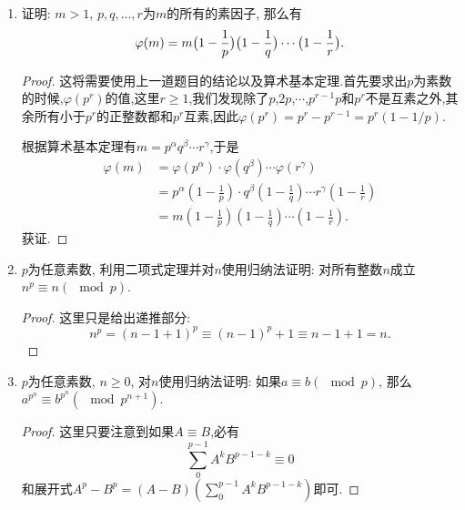 \documentclass[12pt,a4paper]{book} %
\theoremstyle{remark}
\theoremstyle{example}
\theoremstyle{lemma}
\theoremstyle{corollary}
\numberwithin{theorem}{chapter}
\begin{document}
\begin{enumerate}
\begin{proof}
有了这个结论,可以这样来证明:对于每一个与$m$互素的$a$和与$n$互素的$b$，都存在唯一的一个与$mn$互素的$x$,并且不同的$a$和$b$的组合,对应不同的$x$.反证即可,如果不同的$a$和$b$组合,对应到了同一个$x$,将会发生矛盾.即$m|(x-a_1)$,$m|(x-a_2)$,于是$m|(a_1-a_2)$,也就是$a_1 \equiv a_2(\mod{m})$.

反过来,由于当$(x,mn)=1$时,必有$(x,m)=1$和$(x,n)=1$.因此对于每一个与$mn$互素的$x$,必然对应与$m$互素的$a$和与$n$互素的$b$,显然一个$x$只能属于一个模$m$或者$n$的同余类.

有了上述一一对应,根据乘法原理应该有$\varphi(m)\varphi(n) = \varphi(mn)$.
\end{proof}

\item 证明: $m > 1$, $p, q, \ldots, r$为$m$的所有的素因子, 那么有
\[
\varphi(m) = m \big{(} 1 - \frac{1}{p} \big{)} \big{(} 1 - \frac{1}{q} \big{)} \cdots \big{(} 1 - \frac{1}{r} \big{)}.
\]

\begin{proof}
这将需要使用上一道题目的结论以及算术基本定理.首先要求出$p$为素数的时候,$\varphi(p^r)$的值,这里$r \ge 1$,我们发现除了$p$,$2p$,$\cdots$,$p^{r-1}p$和$p^r$不是互素之外,其余所有小于$p^r$的正整数都和$p^r$互素,因此$\varphi(p^r) = p^{r} - p^{r-1} = p^{r}(1 - 1/p)$.

根据算术基本定理有$m=p^{\alpha}q^{\beta}\cdots r^{\gamma}$,于是
\[
\begin{aligned}
\varphi(m) &= \varphi(p^{\alpha}) \cdot \varphi(q^{\beta}) \cdots \varphi(r^{\gamma}) \\
&= p^{\alpha}(1 - \frac{1}{p}) \cdot q^{\beta}(1 - \frac{1}{q}) \cdots r^{\gamma}(1 - \frac{1}{r}) \\
&= m(1 - \frac{1}{p})(1 - \frac{1}{q})\cdots(1 - \frac{1}{r}).
\end{aligned}
\]
获证.
\end{proof}

\item $p$为任意素数, 利用二项式定理并对$n$使用归纳法证明: 对所有整数$n$成立$n^p \equiv n (\mod p)$.

\begin{proof}
这里只是给出递推部分:
\[
n^p = (n-1+1)^p \equiv (n-1)^p + 1 \equiv n-1+1=n.
\]
\end{proof}

\item $p$为任意素数, $n \ge 0$, 对$n$使用归纳法证明: 如果$a \equiv b (\mod p)$, 那么$a^{p^n} \equiv b^{p^n} (\mod p^{n + 1})$.
\begin{proof}
这里只要注意到如果$A \equiv B$,必有
\[
\sum_{0}^{p-1}{A^kB^{p-1-k}} \equiv 0
\]
和展开式$A^p-B^p = (A-B)(\sum_{0}^{p-1}{A^kB^{p-1-k}})$即可.
\end{proof}


\end{enumerate}
\end{document}
